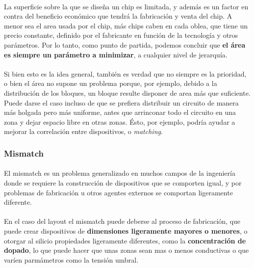 \paragraph{}
La superficie sobre la que se diseña un chip es limitada, y además es
un factor en contra del beneficio económico que tendrá la fabricación y venta del
chip. A menor sea el area usada por el chip, más chips caben en cada oblea, que tiene
un precio constante, definido por el fabricante en función de la tecnología y otros
parámetros. Por lo tanto, como punto de partida, podemos concluir que \textbf{el área
es siempre un parámetro a minimizar}, a cualquier nivel de jerarquía.

\paragraph{}
Si bien esto es la idea general, también es verdad que no siempre es
la prioridad, o bien el área no supone un problema porque, por ejemplo, debido a la
distribución de los bloques, un bloque resulte disponer de area más que suficiente.
Puede darse el caso incluso de que se prefiera distribuir un circuito de manera más
holgada pero más uniforme, antes que arrinconar todo el circuito en una zona y dejar
espacio libre en otras zonas. Ésto, por ejemplo, podría ayudar a mejorar la correlación
entre dispositivos, o \textit{matching}.

\subsubsection{Mismatch}

\paragraph{}
El mismatch es un problema generalizado en muchos campos de
la ingeniería donde se requiere la construcción de dispositivos que se comporten
igual, y por problemas de fabricación u otros agentes externos se comportan ligeramente
diferente.

\paragraph{}
En el caso del layout el mismatch puede deberse al proceso de fabricación,
que puede crear dispositivos de \textbf{dimensiones ligeramente mayores o menores},
o otorgar al silicio propiedades ligeramente diferentes, como la \textbf{concentración de
dopado}, lo que puede hacer que unas zonas sean mas o menos conductivas o que varíen
parmámetros como la tensión umbral.

